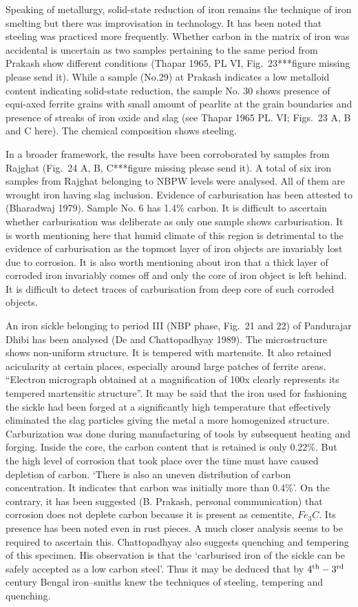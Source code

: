 Speaking of metallurgy, solid-state reduction of iron remains the technique of iron smelting but there was improvisation in technology. It has been noted that steeling was practiced more frequently. Whether carbon in the matrix of iron was accidental is uncertain as two samples pertaining to the same period from Prakash show different conditions (Thapar 1965, PL VI, Fig.~23***figure missing please send it). While a sample (No.29) at Prakash indicates a low metalloid content indicating solid-state reduction, the sample No. 30 shows presence of equi-axed ferrite grains with small amount of pearlite at the grain boundaries and presence of streaks of iron oxide and slag (see Thapar 1965 PL. VI; Figs.~23 A, B and C here). The chemical composition shows steeling.

In a broader framework, the results have been corroborated by samples from Rajghat (Fig.~24 A, B, C***figure missing please send it). A total of six iron samples from Rajghat belonging to NBPW levels were analysed. All of them are wrought iron having slag inclusion. Evidence of carburisation has been attested to (Bharadwaj 1979). Sample No. 6 has 1.4\% carbon. It is difficult to ascertain whether carburisation was deliberate as only one sample shows carburisation. It is worth mentioning here that humid climate of this region is detrimental to the evidence of carburisation as the topmost layer of iron objects are invariably lost due to corrosion. It is also worth mentioning about iron that a thick layer of corroded iron invariably comes off and only the core of iron object is left behind. It is difficult to detect traces of carburisation from deep core of such corroded objects.

An iron sickle belonging to period III (NBP phase, Fig.~21 and 22) of Pandurajar Dhibi has been analysed (De and Chattopadhyay 1989). The microstructure shows non-uniform structure. It is tempered with martensite. It also retained acicularity at certain places, especially around large patches of ferrite areas. “Electron micrograph obtained at a magnification of 100x clearly represents its tempered martensitic structure”. It may be said that the iron used for fashioning the sickle had been forged at a significantly high temperature that effectively eliminated the slag particles giving the metal a more homogenized structure. Carburization was done during manufacturing of tools by subsequent heating and forging. Inside the core, the carbon content that is retained is only 0.22\%. But the high level of corrosion that took place over the time must have caused depletion of carbon. ‘There is also an uneven distribution of carbon concentration. It indicates that carbon was initially more than 0.4\%’. On the contrary, it has been suggested (B. Prakash, personal communication) that corrosion does not deplete carbon because it is present as cementite, $Fe_3C$. Its presence has been noted even in rust pieces. A much closer analysis seems to be required to ascertain this. Chattopadhyay also suggests quenching and tempering of this specimen. His observation is that the ‘carburised iron of the sickle can be safely accepted as a low carbon steel’. Thus it may be deduced that by $4^{\rm th}-3^{\rm rd}$ century Bengal iron–smiths knew the techniques of steeling, tempering and quenching.

